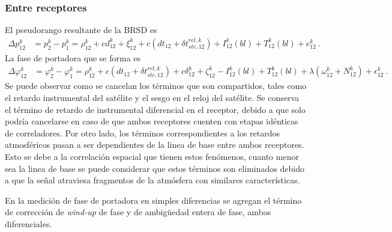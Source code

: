 \documentclass[a4paper,12pt,oneside,onecolumn,final,openright]{book}%
\begin{document}
\subsubsection{Entre receptores}
	El pseudorango resultante de la BRSD es
\begin{align}\label{ec:BRSD_pr}
	\Delta p_{12}^k &= p_2^k - p_1^k = \rho_{12}^k +cd_{12}^k + \xi_{12}^k + c\left( dt_{12} + \delta t_{stc,12}^{rel,k} \right) + I_{12}^k(bl) + T_{12}^k(bl) + e_{12}^k \ .
\end{align}
	La fase de portadora que se forma es
\begin{align}\label{ec:BRSD_fdp}
	\Delta \varphi_{12}^k &= \varphi_2^k - \varphi_1^k = \rho_{12}^k + c\left( dt_{12} + \delta t_{stc,12}^{rel,k} \right) + c\delta_{12}^k + \zeta_{12}^k - I_{12}^k(bl) + T_{12}^k(bl) + \lambda \left( \omega_{12}^k + N_{12}^k \right) + \epsilon_{12}^k \ .
\end{align}
	Se puede observar como se cancelan los términos que son compartidos, tales como el retardo instrumental del satélite y el sesgo en el reloj del satélite. Se conserva el término de retardo de instrumental diferencial en el receptor, debido a que solo podría cancelarse en caso de que ambos receptores cuenten con etapas idénticas de correladores. Por otro lado, los términos correspondientes a los retardos atmosféricos pasan a ser dependientes de la linea de base entre ambos receptores. Esto se debe a la correlación espacial que tienen estos fenómenos, cuanto menor sea la linea de base se puede considerar que estos términos son eliminados debido a que la señal atraviesa fragmentos de la atmósfera con similares características.
	
	En la medición de fase de portadora en simples diferencias se agregan el término de corrección de \textit{wind-up} de fase y de ambigüedad entera de fase, ambos diferenciales.
	
\end{document}

